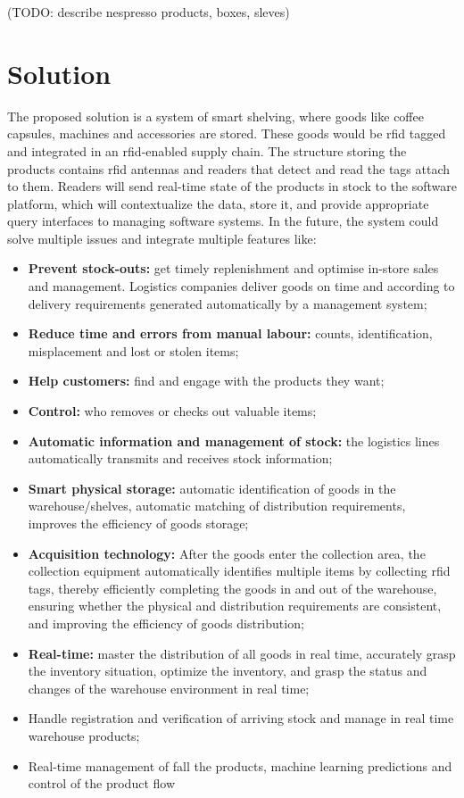 (TODO: describe nespresso products, boxes, sleves)

\section{Solution}

The proposed solution is a system of smart shelving, where goods like coffee capsules, machines and accessories are stored. These goods would be \ac{rfid} tagged and integrated in an \ac{rfid}-enabled supply chain.
The structure storing the products contains \ac{rfid} antennas and readers that detect and read the tags attach to them. Readers will send real-time state of the products in stock to the software platform, which will contextualize the data, store it, and provide appropriate query interfaces to managing software systems.
In the future, the system could solve multiple issues and integrate multiple features like:

\begin{itemize}
    \item \textbf{Prevent stock-outs:} get timely replenishment and optimise in-store sales and management. Logistics companies deliver goods on time and according to delivery requirements generated automatically by a management system;
    \item \textbf{Reduce time and errors from manual labour:} counts, identification, misplacement and lost or stolen items;
    \item \textbf{Help customers:} find and engage with the products they want;
    \item \textbf{Control:} who removes or checks out valuable items;
    \item \textbf{Automatic information and management of stock:} the logistics lines automatically  transmits and receives stock information;
    \item \textbf{Smart physical storage:} automatic identification of goods in the warehouse/shelves, automatic matching of distribution requirements, improves the efficiency of goods storage;
    \item \textbf{Acquisition technology:} After the goods enter the collection area, the collection equipment automatically identifies multiple items by collecting \ac{rfid} tags, thereby efficiently completing the goods in and out of the warehouse, ensuring whether the physical and  distribution  requirements are consistent, and improving the efficiency of goods distribution;
    \item \textbf{Real-time:} master the distribution of all goods in real time, accurately grasp the inventory situation, optimize the inventory, and grasp the status and changes of the warehouse environment in real time;
    \item Handle registration and verification of arriving stock and manage in real time warehouse products;
    \item Real-time  management  of fall the  products, machine learning predictions and control of the product flow
\end{itemize}

